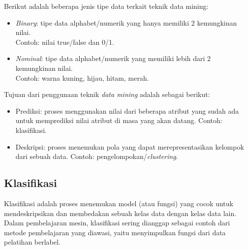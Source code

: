 \noindent Berikut adalah beberapa jenis tipe data terkait teknik data mining:

\begin{itemize}

\item \textit{Binary}: tipe data alphabet/numerik yang hanya memiliki 2 kemungkinan nilai. \\ Contoh: nilai true/false dan 0/1.

\item \textit{Nominal}: tipe data alphabet/numerik yang memiliki lebih dari 2 kemungkinan nilai.\\ Contoh: warna  kuning, hijau, hitam, merah.

\end{itemize}

\noindent Tujuan dari penggunaan teknik \textit{data mining} adalah sebagai berikut:

\begin{itemize}

\item Prediksi: proses menggunakan nilai dari beberapa atribut yang sudah ada untuk memprediksi nilai atribut di masa yang akan datang. Contoh: klasifikasi.

\item Deskripsi: proses menemukan pola yang dapat merepresentasikan kelompok dari sebuah data. Contoh: pengelompokan/\textit{clustering}.

\end{itemize}

\subsection{Klasifikasi} 
Klasifikasi adalah proses menemukan model (atau fungsi) yang cocok untuk mendeskripsikan dan membedakan sebuah kelas data dengan kelas data lain. Dalam pembelajaran mesin, klasifikasi sering dianggap sebagai contoh dari metode pembelajaran yang diawasi, yaitu menyimpulkan fungsi dari data pelatihan berlabel.\\

